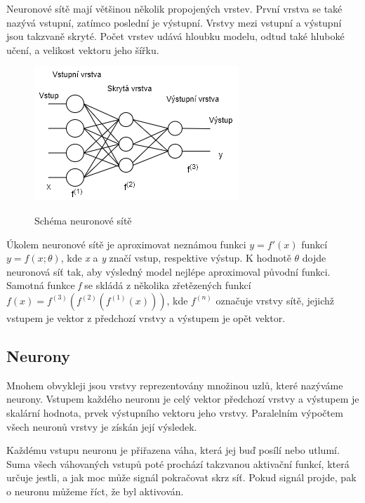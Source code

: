 Neuronové sítě mají většinou několik propojených vrstev.
První vrstva se také nazývá vstupní, 
zatímco poslední je výstupní.
Vrstvy mezi vstupní a výstupní jsou takzvaně skryté.
Počet vrstev udává hloubku modelu, odtud také hluboké učení, 
a velikost vektoru jeho šířku.

\begin{figure}[h]\centering
    \centering
    \includegraphics[width=0.6\linewidth]{obrazky/NNSchema.png}\\[1pt]  
    \caption{Schéma neuronové sítě}    
    \label{obrazekSchemaNeuronoveSite}
\end{figure}


Úkolem neuronové sítě je aproximovat neznámou funkci $ y=f'(x)$
funkcí $ y=f(x;\theta )$, kde \emph{x} a \emph{y} značí vstup, respektive výstup.
K hodnotě $\theta$ dojde neuronová síť tak,
aby výsledný model nejlépe aproximoval původní funkci.
Samotná funkce \emph{f} se skládá z několika zřetězených funkcí $f(x)=f^{(3)}(f^{(2)}(f^{(1)}(x)))$,
kde $f^{(n)}$ označuje vrstvy sítě, jejichž vstupem je vektor z předchozí vrstvy 
a výstupem je opět vektor.\cite{Goodfellow-et-al-2016}

\subsection*{Neurony}
Mnohem obvykleji jsou vrstvy reprezentovány množinou uzlů, které nazýváme neurony.
Vstupem každého neuronu je celý vektor předchozí vrstvy 
a výstupem je skalární hodnota, prvek výstupního vektoru jeho vrstvy.
Paralelním výpočtem všech neuronů vrstvy je získán její výsledek.\cite{Goodfellow-et-al-2016}
\par
Každému vstupu neuronu je přiřazena váha, která jej buď posílí nebo utlumí.
Suma všech váhovaných vstupů poté prochází takzvanou aktivační funkcí,
která určuje jestli, a jak moc může signál pokračovat skrz síť.
Pokud signál projde, pak o neuronu můžeme říct, že byl aktivován.\cite{Nicholson_NeuralNets}

